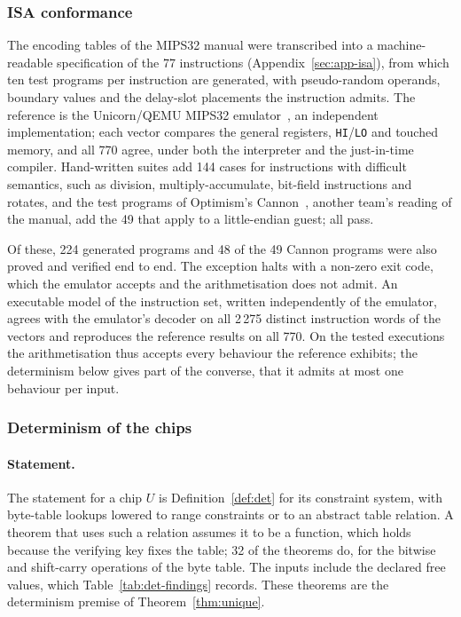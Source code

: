 \subsubsection{ISA conformance}
\label{sec:verification-conformance}
\label{sec:verification-isa}

The encoding tables of the MIPS32 manual were transcribed into a machine-readable specification of the 77 instructions (Appendix~\ref{sec:app-isa}), from which ten test programs per instruction are generated, with pseudo-random operands, boundary values and the delay-slot placements the instruction admits. The reference is the Unicorn/QEMU MIPS32 emulator~\citep{unicorn}, an independent implementation; each vector compares the general registers, \texttt{HI}/\texttt{LO} and touched memory, and all 770 agree, under both the interpreter and the just-in-time compiler. Hand-written suites add 144 cases for instructions with difficult semantics, such as division, multiply-accumulate, bit-field instructions and rotates, and the test programs of Optimism's Cannon~\citep{cannon}, another team's reading of the manual, add the 49 that apply to a little-endian guest; all pass.

Of these, 224 generated programs and 48 of the 49 Cannon programs were also proved and verified end to end. The exception halts with a non-zero exit code, which the emulator accepts and the arithmetisation does not admit. An executable \Lean{} model of the instruction set, written independently of the emulator, agrees with the emulator's decoder on all 2\,275 distinct instruction words of the vectors and reproduces the reference results on all 770. On the tested executions the arithmetisation thus accepts every behaviour the reference exhibits; the determinism below gives part of the converse, that it admits at most one behaviour per input.

\subsubsection{Determinism of the chips}
\label{sec:verification-det}

\paragraph{Statement.} The statement for a chip $U$ is Definition~\ref{def:det} for its constraint system, with byte-table lookups lowered to range constraints or to an abstract table relation. A theorem that uses such a relation assumes it to be a function, which holds because the verifying key fixes the table; 32 of the \ndettotal{} theorems do, for the bitwise and shift-carry operations of the byte table. The inputs include the declared free values, which Table~\ref{tab:det-findings} records. These theorems are the determinism premise of Theorem~\ref{thm:unique}.

